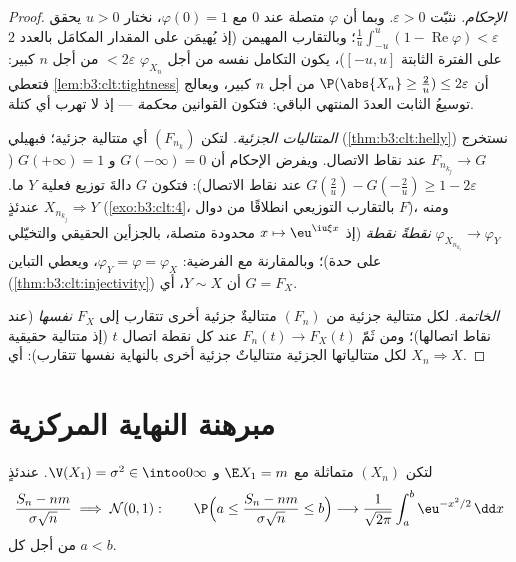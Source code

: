 \begin{proof}
\emph{الإحكام.} نثبّت $\varepsilon > 0$. وبما أن $\varphi$ متصلة عند $0$
مع $\varphi(0) = 1$، نختار $u > 0$ يحقق $\frac1u\int_{-u}^u(1 - \operatorname{Re}\varphi) <
\varepsilon$؛ وبالتقارب
المهيمن (إذ يُهيمَن على المقدار المكامَل بالعدد $2$ على الفترة
الثابتة $[-u,u]$)، يكون التكامل نفسه من أجل $\varphi_{X_n}$
$< 2\varepsilon$ من أجل $n$ كبير: فتعطي \cref{lem:b3:clt:tightness} أن $\P(\abs{X_n} \geq \frac2u)
\leq 2\varepsilon$ من
أجل $n$ كبير، ويعالج توسيعُ الثابت العددَ المنتهي الباقي:
فتكون القوانين \emph{محكمة} --- إذ لا تهرب أي كتلة.

\emph{المتتاليات الجزئية.} لتكن $(F_{n_k})$ أي متتالية جزئية؛
فبهيلي (\cref{thm:b3:clt:helly}) نستخرج $F_{n_{k_j}} \to G$ عند نقاط الاتصال. ويفرض
الإحكام أن $G(-\infty) = 0$ و $G(+\infty) = 1$ ($G(\frac2u) - G(-\frac2u) \geq 1 -
2\varepsilon$ عند نقاط
الاتصال): فتكون $G$ دالةَ توزيع فعلية  $Y$ ما.
عندئذٍ $X_{n_{k_j}} \Rightarrow Y$ (\cref{exo:b3:clt:4}، بالتقارب التوزيعي انطلاقًا من دوال
$F$)، ومنه $\varphi_{X_{n_{k_j}}} \to \varphi_Y$ \emph{نقطةً نقطة} (إذ $x
\mapsto \eu^{\iu\xi x}$ محدودة متصلة،
بالجزأين الحقيقي والتخيّلي على حدة)؛ وبالمقارنة مع الفرضية:
$\varphi_Y = \varphi = \varphi_X$، ويعطي التباين (\cref{thm:b3:clt:injectivity}) أن $Y \sim X$، أي $G =
F_X$.

\emph{الخاتمة.} لكل متتالية جزئية من $(F_n)$ متتاليةٌ جزئية
أخرى تتقارب إلى $F_X$ \emph{نفسها} (عند نقاط اتصالها)؛ ومن ثَمّ
$F_n(t) \to F_X(t)$ عند كل نقطة اتصال $t$ (إذ متتالية حقيقية لكل متتالياتها
الجزئية متتالياتٌ جزئية أخرى بالنهاية نفسها تتقارب): أي $X_n \Rightarrow X$.
\end{proof}

\section{مبرهنة النهاية المركزية}

\begin{theorem}\label{thm:b3:clt:clt}
لتكن $(X_n)$  متماثلة مع $\E X_1 = m$ و $\V(X_1) =
\sigma^2 \in \intoo0\infty$.
عندئذٍ
\[
\frac{S_n - nm}{\sigma\sqrt n} \;\Longrightarrow\; \mathcal
N(0, 1) :
\qquad
\P\Bigl(a \leq \frac{S_n - nm}{\sigma\sqrt n} \leq
b\Bigr) \longrightarrow
\frac{1}{\sqrt{2\pi}}\int_a^b\eu^{-x^2/2}\,\dd x
\]
من أجل كل $a < b$.
\end{theorem}

